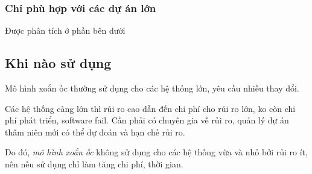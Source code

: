 \documentclass[14pt]{extarticle}
\begin{document}
\subsubsection*{Chỉ phù hợp với các dự án lớn}
Được phân tích ở phần bên dưới
\subsection{Khi nào sử dụng}
Mô hình xoắn ốc thường sử dụng cho các hệ thống lớn, yêu cầu nhiều thay đổi.

Các hệ thống càng lớn thì rủi ro cao dẫn đến chi phí cho rủi ro lớn, ko còn
chi phí phát triển, software fail. Cần phải có chuyên gia về rủi ro, quản lý dự án
thâm niên mới có thể dự đoán và hạn chế rủi ro.

Do đó, \textit{mô hình xoắn ốc} không sử dụng cho các hệ thống vừa và nhỏ bởi rủi ro ít,
nên nếu sử dụng chỉ làm tăng chi phí, thời gian.
\end{document}
